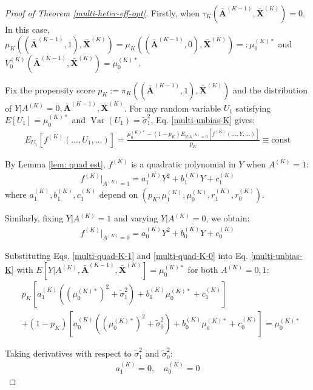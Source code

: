 \documentclass[11pt]{article}
\theoremstyle{referenceplain}
\theoremstyle{referencedefinition}
\theoremstyle{referenceremark}
\begin{document}
\begin{proof}[Proof of Theorem \ref{multi-heter-eff-opt}]
Firstly, when $\tau_K(\bar{\mathbf{A}}^{(K-1)}, \allowbreak\bar{\mathbf{X}}^{(K)}) = 0$. In this case, $\mu_K((\bar{\mathbf{A}}^{(K-1)}, 1), \allowbreak\bar{\mathbf{X}}^{(K)}) \allowbreak= \mu_K((\bar{\mathbf{A}}^{(K-1)}, 0), \allowbreak\bar{\mathbf{X}}^{(K)}) \allowbreak=: \mu_0^{(K)*}$ and $V_0^{(K)}(\bar{\mathbf{A}}^{(K-1)}, \allowbreak\bar{\mathbf{X}}^{(K)}) \allowbreak= \mu_0^{(K)*}$.

Fix the propensity score $p_K := \pi_K((\bar{\mathbf{A}}^{(K-1)}, 1), \bar{\mathbf{X}}^{(K)})$ and the distribution of $Y | A^{(K)} = 0, \bar{\mathbf{A}}^{(K-1)}, \bar{\mathbf{X}}^{(K)}$. For any random variable $U_1$ satisfying $E[U_1] = \mu_0^{(K)*}$ and $\operatorname{Var}(U_1) = \widetilde{\sigma}_1^2$, Eq. \eqref{multi-unbias-K} gives:
\begin{align*}
    E_{U_1}[f^{(K)}(\ldots, U_1, \ldots)] = \frac{\mu_0^{(K)*} - (1-p_K) E_{Y|A^{(K)}=0}[f^{(K)}(\ldots, Y, \ldots)]}{p_K} \equiv \text{const}
\end{align*}

By Lemma \ref{lem: quad est}, $f^{(K)}$ is a quadratic polynomial in $Y$ when $A^{(K)} = 1$:
\begin{align}\label{multi-quad-K-1}
    f^{(K)}|_{A^{(K)}=1} = a_{1}^{(K)} Y^2 + b_{1}^{(K)} Y + c_{1}^{(K)}
\end{align}
where $a_{1}^{(K)}, b_{1}^{(K)}, c_{1}^{(K)}$ depend on $(p_K, \mu_1^{(K)}, \mu_0^{(K)}, r_1^{(K)}, r_0^{(K)})$.

Similarly, fixing $Y | A^{(K)} = 1$ and varying $Y | A^{(K)} = 0$, we obtain:
\begin{align}\label{multi-quad-K-0}
    f^{(K)}|_{A^{(K)}=0} = a_{0}^{(K)} Y^2 + b_{0}^{(K)} Y + c_{0}^{(K)}
\end{align}

Substituting Eqs. \eqref{multi-quad-K-1} and \eqref{multi-quad-K-0} into Eq. \eqref{multi-unbias-K} with $E[Y | A^{(K)}, \bar{\mathbf{A}}^{(K-1)}, \bar{\mathbf{X}}^{(K)}] = \mu_0^{(K)*}$ for both $A^{(K)} = 0, 1$:
\begin{align*}
    &p_K [a_{1}^{(K)} ((\mu_0^{(K)*})^2 + \widetilde{\sigma}_1^2) + b_{1}^{(K)} \mu_0^{(K)*} + c_{1}^{(K)}] \\
    &+ (1-p_K) [a_{0}^{(K)} ((\mu_0^{(K)*})^2 + \widetilde{\sigma}_0^2) + b_{0}^{(K)} \mu_0^{(K)*} + c_{0}^{(K)}] = \mu_0^{(K)*}
\end{align*}

Taking derivatives with respect to $\widetilde{\sigma}_1^2$ and $\widetilde{\sigma}_0^2$:
\begin{align*}
    a_{1}^{(K)} = 0, \quad a_{0}^{(K)} = 0
\end{align*}


\end{proof}
\end{document}
